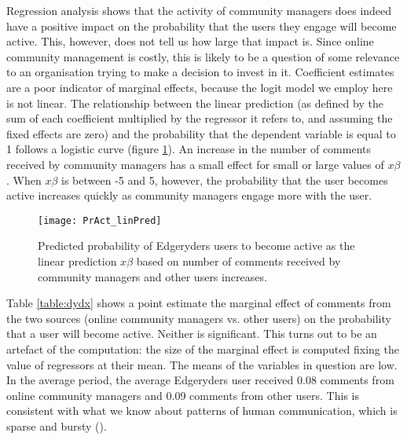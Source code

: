 Regression analysis shows that the activity of community managers does indeed have a positive impact on the probability that the users they engage will become active. This, however, does not tell us how large that impact is. Since online community management is costly, this is likely to be a question of some relevance to an organisation trying to make a decision to invest in it. 
Coefficient estimates are a poor indicator of marginal effects, because the logit model we employ here is not linear. The relationship between the linear prediction (as defined by the sum of each coefficient multiplied by the regressor it refers to, and assuming the fixed effects are zero) and the probability that the dependent variable is equal to 1 follows a logistic curve (figure \ref{fig:probActivityLinPredict}). An increase in the number of comments received by community managers has a small effect for small or large values of $x\beta$. When $x\beta$ is between -5 and 5, however, the probability that the user becomes active increases quickly as community managers engage more with the user.

\begin{figure}
	\texttt{[image: PrAct\_linPred]}
	\caption{Predicted probability of Edgeryders users to become active as the linear prediction $x\beta$ based on number of comments received by community managers and other users increases.}
\label{fig:probActivityLinPredict}
\end{figure}

Table \ref{table:dydx} shows a point estimate the marginal effect of comments from the two sources (online community managers vs. other users) on the probability that a user will become active. Neither is significant. This turns out to be an artefact of the computation: the size of the marginal effect is computed fixing the value of regressors at their mean. The means of the variables in question are low. In the average period, the average Edgeryders user received 0.08 comments from online community managers and 0.09 comments from other users. This is consistent with what we know about patterns of human communication, which is sparse and bursty (\cite{holme2012temporal}). 

